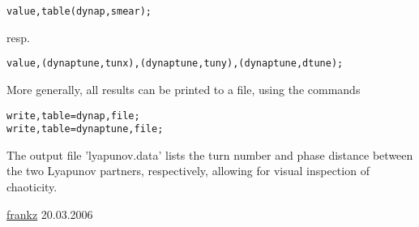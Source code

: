 \begin{verbatim}
value,table(dynap,smear);\end{verbatim} 
 resp. 
\begin{verbatim}
value,(dynaptune,tunx),(dynaptune,tuny),(dynaptune,dtune);\end{verbatim}


 More generally, all results can be printed to a file, using the commands 
 
\begin{verbatim}
write,table=dynap,file;
write,table=dynaptune,file;
\end{verbatim}


 The output file 'lyapunov.data' lists  
 the turn number and phase distance between the 
 two Lyapunov partners, respectively, 
 allowing for visual inspection of chaoticity.
 
 \href{http://consult.cern.ch/xwho/people/62690}{frankz}
 20.03.2006
 

